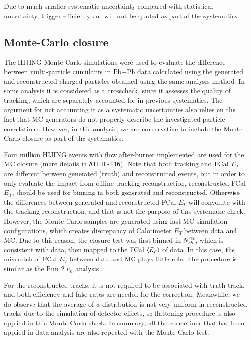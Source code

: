 Due to much smaller systematic uncertainty compared with statistical uncertainty, trigger efficiency cut will not be quoted as part of the systematics.



\subsection{Monte-Carlo closure}
The HIJING Monte Carlo simulations were used to evaluate the difference between multi-particle cumulants in Pb+Pb data calculated using the generated and reconstructed charged particles obtained using the same analysis method. In some analysis it is considered as a crosscheck, since it assesses the quality of tracking, which are separately accounted for in previous systematics. The argument for not accounting it as a systematic uncertainties also relies on the fact that MC generators do not properly describe the investigated particle correlations. However, in this analysis, we are conservative to include the Monte-Carlo closure as part of the systematics.

Four million HIJING events with flow after-burner implemented are used for the MC closure (more details in \verb|ATLHI-116|). Note that both tracking and FCal $E_{T}$ are different between generated (truth) and reconstructed events, but in order to only evaluate the impact from offline tracking reconstruction, reconstructed FCal $E_{T}$, should be used for binning in both generated and reconstructed. Otherwise the differences between generated and reconstructed FCal $E_{T}$ will convolute with the tracking reconstruction, and that is not the purpose of this systematic check. However, the Monte-Carlo samples are generated using fast MC simulation configurations, which creates discrepancy of Calorimeter $E_{T}$ between data and MC. Due to this reason, the closure test was first binned in $N_{ch}^{rec}$, which is consistent with data, then mapped to the FCal $\left\langle E_T\right\rangle$ of data. In this case, the mismatch of FCal $E_{T}$ between data and MC plays little role. The procedure is similar as the Run 2 $v_n$ analysis~\cite{Burka:2151932}.

For the reconstructed tracks, it is not required to be associated with truth track, and both efficiency and fake rates are needed for the correction. Meanwhile, we do observe that the average of $\phi$ distribution is not very uniform in reconstructed tracks due to the simulation of detector effects, so flattening procedure is also applied in this Monte-Carlo check. In summary, all the corrections that has been applied in data analysis are also repeated with the Monte-Carlo test.


